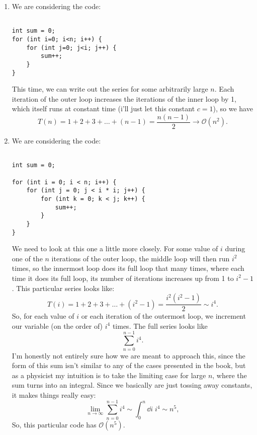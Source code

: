 \documentclass{article}
\begin{document}
\begin{enumerate}
\item We are considering the code:

\begin{verbatim}

int sum = 0;
for (int i=0; i<n; i++) {
    for (int j=0; j<i; j++) {
        sum++;
    }
}

\end{verbatim}

This time, we can write out the series for some arbitrarily large $n$. Each iteration of the outer loop increases the iterations of the inner loop by 1, which itself runs at constant time (i'll just let this constant $c=1$), so we have
\begin{equation*}
    T(n) = 1 + 2 + 3 + \ldots + (n-1) = \frac{n(n-1)}{2} \rightarrow \mathcal{O}(n^2).
\end{equation*}






\item We are considering the code:

\begin{verbatim}

int sum = 0;

for (int i = 0; i < n; i++) {
    for (int j = 0; j < i * i; j++) {
        for (int k = 0; k < j; k++) {
            sum++;
        }
    }
}

\end{verbatim}

We need to look at this one a little more closely. For some value of $i$ during one of the $n$ iterations of the outer loop, the middle loop will then run $i^2$ times, so the innermost loop does its full loop that many times, where each time it does its full loop, its number of iterations increases up from 1 to $i^2-1$. This particular series looks like:
\begin{equation*}
    T(i) = 1 + 2 + 3 + \ldots + (i^2-1) = \frac{i^2(i^2-1)}{2} \sim i^4.
\end{equation*}
So, for each value of $i$ or each iteration of the outermost loop, we increment our variable (on the order of) $i^4$ times. The full series looks like
\begin{equation*}
    \sum_{n=0}^{n-1} i^4.
\end{equation*}
I'm honestly not entirely sure how we are meant to approach this, since the form of this sum isn't similar to any of the cases presented in the book, but as a physicist my intuition is to take the limiting case for large $n$, where the sum turns into an integral. Since we basically are just tossing away constants, it makes things really easy:
\begin{equation*}
    \lim_{n\rightarrow\infty} \sum_{n=0}^{n-1} i^4 \sim \int_0^n \dd i \;i^4 \sim n^5,
\end{equation*}
So, this particular code has $\mathcal{O}(n^5)$.
    
\end{enumerate}
\end{document}
